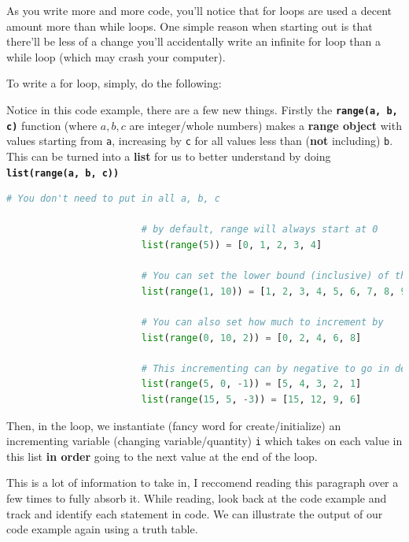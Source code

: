 \documentclass[12pt,a4paper]{book}
\newcommand{\coderef}[1]{Code Ex. \ref{#1}}
\begin{document}
					As you write more and more code, you'll notice that for loops are used a decent amount more than while loops. One simple reason when starting out is that there'll be less of a change you'll accidentally write an infinite for loop than a while loop (which may crash your computer). 
					
					To write a for loop, simply, do the following:
					

					Notice in this code example, there are a few new things. Firstly the \textbf{\texttt{range(a, b, c)}} function (where $a, b, c$ are integer/whole numbers) makes a \textbf{range object} with values starting from \texttt{a}, increasing by \texttt{c} for all values less than (\textbf{not} including) \texttt{b}. This can be turned into a \textbf{list} for us to better understand by doing \textbf{\texttt{list(range(a, b, c))}}
					\begin{lstlisting}[language=python, title={range function}, caption={How the Range function works} label={code-py:range}]
						# You don't need to put in all a, b, c

						# by default, range will always start at 0
						list(range(5)) = [0, 1, 2, 3, 4]

						# You can set the lower bound (inclusive) of the range
						list(range(1, 10)) = [1, 2, 3, 4, 5, 6, 7, 8, 9]

						# You can also set how much to increment by
						list(range(0, 10, 2)) = [0, 2, 4, 6, 8]

						# This incrementing can by negative to go in decending order
						list(range(5, 0, -1)) = [5, 4, 3, 2, 1]
						list(range(15, 5, -3)) = [15, 12, 9, 6]
					\end{lstlisting}
					
					Then, in the loop, we instantiate (fancy word for create/initialize) an incrementing variable (changing variable/quantity) \texttt{i} which takes on each value in this list \textbf{in order} going to the next value at the end of the loop.
					
					This is a lot of information to take in, I reccomend reading this paragraph over a few times to fully absorb it. While reading, look back at the code example and track and identify each statement in code. We can illustrate the output of our code example again using a truth table.
\end{document}

